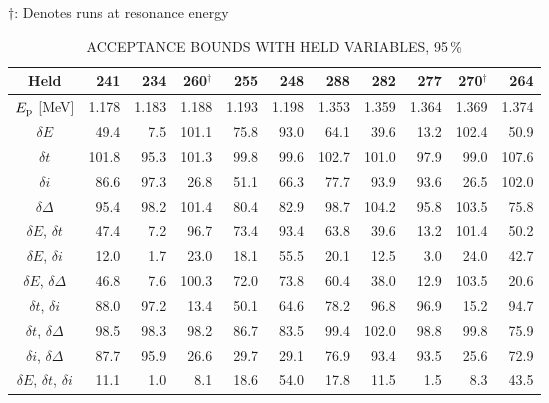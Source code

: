 \begin{table}
\begin{center}
        \vspace{0.5em}
        {\fontsize{10}{12}\selectfont $\dagger$: Denotes runs at
        resonance energy}
    \end{center}
\end{table}

\begin{table}
\small
    \begin{center}
        \caption{ACCEPTANCE BOUNDS WITH HELD VARIABLES, 95\,\%}
        \label{tab:acceptance-uncertainty-95}
        \begin{tabular}{crrrrrrrrrr}
            \toprule
            \midrule
            \textbf{Held}
                & \textbf{241} & \textbf{234} & \textbf{260}$^\dagger$ & \textbf{255} & \textbf{248}
                & \textbf{288} & \textbf{282} & \textbf{277} & \textbf{270}$^\dagger$ & \textbf{264} \\
            \midrule
$E_{\rm p}$ [MeV] & 1.178 & 1.183 & 1.188 & 1.193 & 1.198 & 1.353 & 1.359 & 1.364 & 1.369 & 1.374 \\
\midrule
$\delta E$     &  49.4 &   7.5 & 101.1 &  75.8 &  93.0 &  64.1 &  39.6 &  13.2 & 102.4 &  50.9 \\
$\delta t$     & 101.8 &  95.3 & 101.3 &  99.8 &  99.6 & 102.7 & 101.0 &  97.9 &  99.0 & 107.6 \\
$\delta i$     &  86.6 &  97.3 &  26.8 &  51.1 &  66.3 &  77.7 &  93.9 &  93.6 &  26.5 & 102.0 \\
$\delta\Delta$ &  95.4 &  98.2 & 101.4 &  80.4 &  82.9 &  98.7 & 104.2 &  95.8 & 103.5 &  75.8 \\
$\delta E$, $\delta t$     &  47.4 &   7.2 &  96.7 &  73.4 &  93.4 &  63.8 &  39.6 &  13.2 & 101.4 &  50.2 \\
$\delta E$, $\delta i$     &  12.0 &   1.7 &  23.0 &  18.1 &  55.5 &  20.1 &  12.5 &   3.0 &  24.0 &  42.7 \\
$\delta E$, $\delta\Delta$ &  46.8 &   7.6 & 100.3 &  72.0 &  73.8 &  60.4 &  38.0 &  12.9 & 103.5 &  20.6 \\
$\delta t$, $\delta i$     &  88.0 &  97.2 &  13.4 &  50.1 &  64.6 &  78.2 &  96.8 &  96.9 &  15.2 &  94.7 \\
$\delta t$, $\delta\Delta$ &  98.5 &  98.3 &  98.2 &  86.7 &  83.5 &  99.4 & 102.0 &  98.8 &  99.8 &  75.9 \\
$\delta i$, $\delta\Delta$ &  87.7 &  95.9 &  26.6 &  29.7 &  29.1 &  76.9 &  93.4 &  93.5 &  25.6 &  72.9 \\
$\delta E$, $\delta t$, $\delta i$     &  11.1 &   1.0 &   8.1 &  18.6 &  54.0 &  17.8 &  11.5 &   1.5 &   8.3 &  43.5 \\

\end{tabular}
\end{center}
\end{table}
